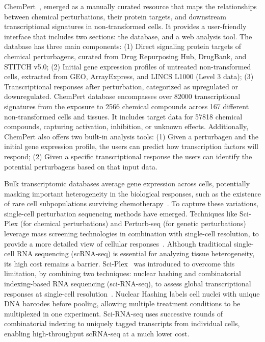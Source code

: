 ChemPert~\cite{RN68}, emerged as a manually curated resource that maps the relationships between chemical perturbations, their protein targets, and downstream transcriptional signatures in non-transformed cells. 
It provides a user-friendly interface that includes two sections: the database, and a web analysis tool. The database has three main components: 
(1) Direct signaling protein targets of chemical perturbagens, curated from Drug Repurposing Hub, DrugBank, and STITCH v5.0; 
(2) Initial gene expression profiles of untreated non-transformed cells, extracted from GEO, ArrayExpress, and LINCS L1000 (Level 3 data); 
(3) Transcriptional responses after perturbation, categorized as upregulated or downregulated. 
ChemPert database encompasses over 82000 transcriptional signatures from the exposure to 2566 chemical compounds across 167 different non-transformed cells and tissues. 
It includes target data for 57818 chemical compounds, capturing activation, inhibition, or unknown effects. 
Additionally, ChemPert also offers two built-in analysis tools: 
(1) Given a perturbagen and the initial gene expression profile, the users can predict how transcription factors will respond; 
(2) Given a specific transcriptional response the users can identify the potential perturbagens based on that input data.


Bulk transcriptomic databases average gene expression across cells, potentially masking important heterogeneity in the biological responses, such as the existence of rare cell subpopulations surviving chemotherapy~\cite{RN88}. 
To capture these variations, single-cell perturbation sequencing methods have emerged. 
Techniques like Sci-Plex (for chemical perturbations) and Perturb-seq (for genetic perturbations) leverage mass screening technologies in combination with single-cell resolution, to provide a more detailed view of cellular responses~\cite{RN97}. 
Although traditional single-cell RNA sequencing (scRNA-seq) is essential for analyzing tissue heterogeneity, its high cost remains a barrier. Sci-Plex~\cite{RN88} was introduced to overcome this limitation, by combining two techniques: 
nuclear hashing and combinatorial indexing-based RNA sequencing (sci-RNA-seq), to assess global transcriptional responses at single-cell resolution~\cite{RN125, RN126}. 
Nuclear Hashing labels cell nuclei with unique DNA barcodes before pooling, allowing multiple treatment conditions to be multiplexed in one experiment. 
Sci-RNA-seq uses successive rounds of combinatorial indexing to uniquely tagged transcripts from individual cells, enabling high-throughput scRNA-seq at a much lower cost. 


